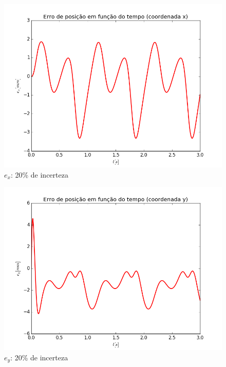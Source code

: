 \documentclass[]{politex}
\begin{document}
\begin{multicols}{2}
\begin{figure}[H]
	\centering
	\includegraphics[scale=0.42]{imagens/ex_20.png}  
	\caption{$e_x$: 20\% de incerteza}
	\label{fig:ex_20}
\end{figure}
\begin{figure}[H]
	\centering
	\includegraphics[scale=0.42]{imagens/ey_20.png}  
	\caption{$e_y$: 20\% de incerteza}
	\label{fig:ey_20}
\end{figure}
\end{multicols}
\end{document}
